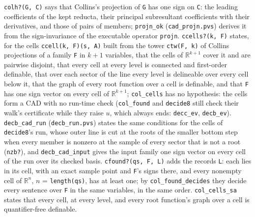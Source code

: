 \documentclass[11pt]{article}
\begin{document}
\texttt{colh?(G, C)} says that Collins's projection of \texttt{G} has one sign on \texttt{C}: the leading coefficients
of the kept reducta, their principal subresultant coefficients with their derivatives, and those of pairs of members;
\texttt{projn\_ok} (\texttt{cad\_projn.pvs}) derives it from the sign-invariance of the executable operator
\texttt{projn}. \texttt{ccells?(k, F)} states, for the cells \texttt{ccell(k, F)(s, A)} built from the tower
\texttt{ctw(F, k)} of Collins projections of a family \texttt{F} in $k+1$ variables, that the cells of $\mathbb{R}^{k+1}$
cover it and are pairwise disjoint, that every cell at every level is connected and first-order definable, that over
each sector of the line every level is delineable over every cell below it, that the graph of every root function over a
cell is definable, and that \texttt{F} has one sign vector on every cell of $\mathbb{R}^{k+1}$; \texttt{col\_cells} has no
hypothesis: the cells form a CAD with no run-time check (\texttt{col\_found} and \texttt{decide8} still check their walk's
certificate while they raise $u$, which always ends: \texttt{decc\_ev}, \texttt{decb\_ev}).
\texttt{decb\_cad\_run} (\texttt{decb\_run.pvs}) states the same conditions for the cells of \texttt{decide8}'s run,
whose outer line is cut at the roots of the smaller bottom step when every member is nonzero at the sample of every
sector that is not a root (\texttt{nzb?}), and \texttt{decb\_cad\_input} gives the input family one sign vector on every
cell of the run over its checked basis. \texttt{cfound?(qs, F, L)} adds the records \texttt{L}: each lies in its cell, with an
exact sample point and \texttt{F}'s signs there, and every nonempty cell of $\mathbb{R}^n$, $n$ = \texttt{length(qs)},
has at least one; by \texttt{col\_found\_decides} they decide every sentence over \texttt{F} in the same variables, in
the same order. \texttt{col\_cells\_sa} states that every cell, at every level, and every root function's graph over a
cell is quantifier-free definable.
\end{document}
